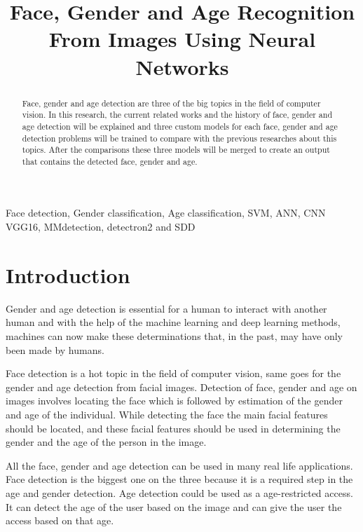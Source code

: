 \documentclass[conference]{IEEEtran}
\begin{document}
\title{Face, Gender and Age Recognition From Images Using Neural Networks\\}

\author{
}

\maketitle
\begin{abstract}
Face, gender and age detection are three of the big topics in the field of computer vision. In this research, the current related works and the history of face, gender and age detection will be explained and three custom models for each face, gender and age detection problems will be trained to compare with the previous researches about this topics. After the comparisons these three models will be merged to create an output that contains the detected face, gender and age.
\end{abstract}
\begin{IEEEkeywords}
Face detection, Gender classification, Age classification, SVM, ANN, CNN VGG16, MMdetection, detectron2 and SDD
\end{IEEEkeywords}

\section{Introduction}
Gender and age detection is essential for a human to interact with another human and with the help of the machine learning and deep learning methods, machines can now make these determinations that, in the past, may have only been made by humans.

\bigskip

Face detection is a hot topic in the field of computer vision, same goes for the gender and age detection from facial images. Detection of face, gender and age on images involves locating the face which is followed by estimation of the gender and age of the individual. While detecting the face the main facial features should be located, and these facial features should be used in determining the gender and the age of the person in the image.

\bigskip

All the face, gender and age detection can be used in many real life applications. Face detection is the biggest one on the three because it is a required step in the age and gender detection. Age detection could be used as a age-restricted access. It can detect the age of the user based on the image and can give the user the access based on that age. 
\end{document}

